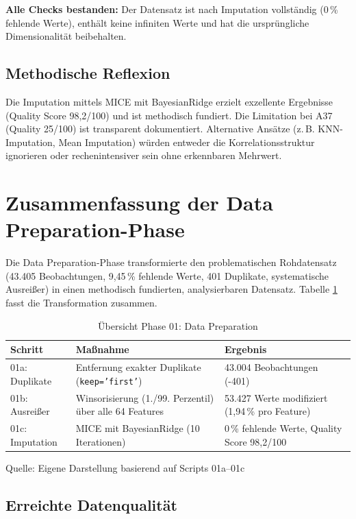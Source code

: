 \textbf{Alle Checks bestanden:} Der Datensatz ist nach Imputation vollständig (0\,\% fehlende Werte), enthält keine infiniten Werte und hat die ursprüngliche Dimensionalität beibehalten.

\subsection{Methodische Reflexion}

Die Imputation mittels MICE mit BayesianRidge erzielt exzellente Ergebnisse (Quality Score 98,2/100) und ist methodisch fundiert. Die Limitation bei A37 (Quality 25/100) ist transparent dokumentiert. Alternative Ansätze (z.\,B. KNN-Imputation, Mean Imputation) würden entweder die Korrelationsstruktur ignorieren oder rechenintensiver sein ohne erkennbaren Mehrwert.

\section{Zusammenfassung der Data Preparation-Phase}

Die Data Preparation-Phase transformierte den problematischen Rohdatensatz (43.405 Beobachtungen, 9,45\,\% fehlende Werte, 401 Duplikate, systematische Ausreißer) in einen methodisch fundierten, analysierbaren Datensatz. Tabelle \ref{tab:phase01_summary} fasst die Transformation zusammen.

\begin{table}[htbp]
\centering
\caption{Übersicht Phase 01: Data Preparation}
\label{tab:phase01_summary}
\begin{tabular}{lp{4.5cm}p{4.5cm}}
\toprule
\textbf{Schritt} & \textbf{Maßnahme} & \textbf{Ergebnis} \\
\midrule
01a: Duplikate & Entfernung exakter Duplikate (\texttt{keep='first'}) & 43.004 Beobachtungen (-401) \\
\midrule
01b: Ausreißer & Winsorisierung (1./99. Perzentil) über alle 64 Features & 53.427 Werte modifiziert (1,94\,\% pro Feature) \\
\midrule
01c: Imputation & MICE mit BayesianRidge (10 Iterationen) & 0\,\% fehlende Werte, Quality Score 98,2/100 \\
\bottomrule
\end{tabular}
\par\smallskip
{\footnotesize Quelle: Eigene Darstellung basierend auf Scripts 01a--01c}
\end{table}

\subsection{Erreichte Datenqualität}

